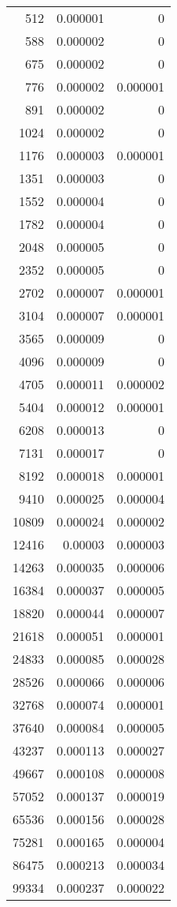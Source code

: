 \begin{tabular}{r r r}
512 & 0.000001 & 0 \\
588 & 0.000002 & 0 \\
675 & 0.000002 & 0 \\
776 & 0.000002 & 0.000001 \\
891 & 0.000002 & 0 \\
1024 & 0.000002 & 0 \\
1176 & 0.000003 & 0.000001 \\
1351 & 0.000003 & 0 \\
1552 & 0.000004 & 0 \\
1782 & 0.000004 & 0 \\
2048 & 0.000005 & 0 \\
2352 & 0.000005 & 0 \\
2702 & 0.000007 & 0.000001 \\
3104 & 0.000007 & 0.000001 \\
3565 & 0.000009 & 0 \\
4096 & 0.000009 & 0 \\
4705 & 0.000011 & 0.000002 \\
5404 & 0.000012 & 0.000001 \\
6208 & 0.000013 & 0 \\
7131 & 0.000017 & 0 \\
8192 & 0.000018 & 0.000001 \\
9410 & 0.000025 & 0.000004 \\
10809 & 0.000024 & 0.000002 \\
12416 & 0.00003 & 0.000003 \\
14263 & 0.000035 & 0.000006 \\
16384 & 0.000037 & 0.000005 \\
18820 & 0.000044 & 0.000007 \\
21618 & 0.000051 & 0.000001 \\
24833 & 0.000085 & 0.000028 \\
28526 & 0.000066 & 0.000006 \\
32768 & 0.000074 & 0.000001 \\
37640 & 0.000084 & 0.000005 \\
43237 & 0.000113 & 0.000027 \\
49667 & 0.000108 & 0.000008 \\
57052 & 0.000137 & 0.000019 \\
65536 & 0.000156 & 0.000028 \\
75281 & 0.000165 & 0.000004 \\
86475 & 0.000213 & 0.000034 \\
99334 & 0.000237 & 0.000022 \\

\end{tabular}
